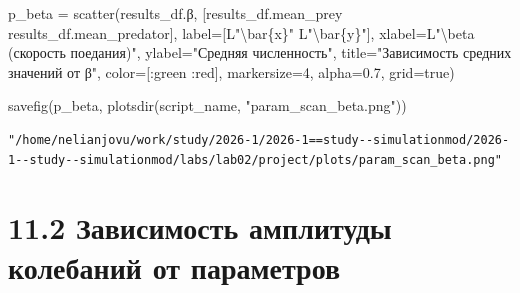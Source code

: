 \documentclass[
  12pt,
  a4paper,
  DIV=11,
  numbers=noendperiod]{scrreprt}
\newenvironment{Shaded}{\begin{snugshade}}{\end{snugshade}}
\newcommand{\ConstantTok}[1]{\textcolor[rgb]{0.56,0.35,0.01}{#1}}
\newcommand{\FloatTok}[1]{\textcolor[rgb]{0.68,0.00,0.00}{#1}}
\newcommand{\FunctionTok}[1]{\textcolor[rgb]{0.28,0.35,0.67}{#1}}
\newcommand{\NormalTok}[1]{\textcolor[rgb]{0.00,0.23,0.31}{#1}}
\newcommand{\OperatorTok}[1]{\textcolor[rgb]{0.37,0.37,0.37}{#1}}
\newcommand{\SpecialCharTok}[1]{\textcolor[rgb]{0.37,0.37,0.37}{#1}}
\newcommand{\StringTok}[1]{\textcolor[rgb]{0.13,0.47,0.30}{#1}}
\begin{document}
\begin{Shaded}
\begin{Highlighting}[]
\NormalTok{p\_beta }\OperatorTok{=} \FunctionTok{scatter}\NormalTok{(results\_df.β, [results\_df.mean\_prey results\_df.mean\_predator],}
\NormalTok{    label}\OperatorTok{=}\NormalTok{[L}\StringTok{"}\SpecialCharTok{\textbackslash{}b}\StringTok{ar\{x\}"}\NormalTok{ L}\StringTok{"}\SpecialCharTok{\textbackslash{}b}\StringTok{ar\{y\}"}\NormalTok{],}
\NormalTok{    xlabel}\OperatorTok{=}\NormalTok{L}\StringTok{"}\SpecialCharTok{\textbackslash{}b}\StringTok{eta (скорость поедания)"}\NormalTok{,}
\NormalTok{    ylabel}\OperatorTok{=}\StringTok{"Средняя численность"}\NormalTok{,}
\NormalTok{    title}\OperatorTok{=}\StringTok{"Зависимость средних значений от β"}\NormalTok{,}
\NormalTok{    color}\OperatorTok{=}\NormalTok{[}\OperatorTok{:}\NormalTok{green }\OperatorTok{:}\NormalTok{red],}
\NormalTok{    markersize}\OperatorTok{=}\FloatTok{4}\NormalTok{,}
\NormalTok{    alpha}\OperatorTok{=}\FloatTok{0.7}\NormalTok{,}
\NormalTok{    grid}\OperatorTok{=}\ConstantTok{true}\NormalTok{)}

\FunctionTok{savefig}\NormalTok{(p\_beta, }\FunctionTok{plotsdir}\NormalTok{(script\_name, }\StringTok{"param\_scan\_beta.png"}\NormalTok{))}
\end{Highlighting}
\end{Shaded}

\begin{verbatim}
"/home/nelianjovu/work/study/2026-1/2026-1==study--simulationmod/2026-1--study--simulationmod/labs/lab02/project/plots/param_scan_beta.png"
\end{verbatim}

\section{11.2 Зависимость амплитуды колебаний от
параметров}\label{ux437ux430ux432ux438ux441ux438ux43cux43eux441ux442ux44c-ux430ux43cux43fux43bux438ux442ux443ux434ux44b-ux43aux43eux43bux435ux431ux430ux43dux438ux439-ux43eux442-ux43fux430ux440ux430ux43cux435ux442ux440ux43eux432}
\end{document}
